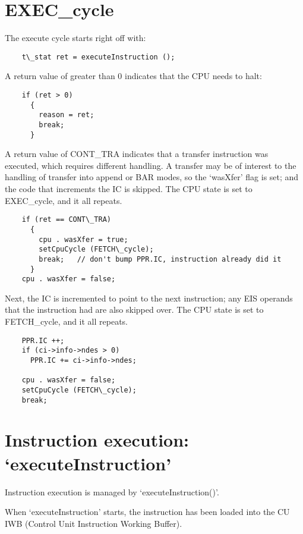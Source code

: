 \documentclass[notitlepage]{report}
\begin{document}
\section{EXEC\_cycle}

The execute cycle starts right off with:

\begin{verbatim}
    t\_stat ret = executeInstruction ();
\end{verbatim}

A return value of greater than 0 indicates that the CPU needs to halt:

\begin{verbatim}
    if (ret > 0)
      {
        reason = ret;
        break;
      }
\end{verbatim}

A return value of CONT\_TRA indicates that a transfer instruction 
was executed, which requires different handling. A transfer 
may be of interest to the handling of
transfer into append or BAR modes, so the `wasXfer' flag is set; and
the code that increments the IC is skipped. The CPU state is set to
EXEC\_cycle, and it all repeats.

\begin{verbatim}
    if (ret == CONT\_TRA)
      {
        cpu . wasXfer = true;
        setCpuCycle (FETCH\_cycle);
        break;   // don't bump PPR.IC, instruction already did it
      }
    cpu . wasXfer = false;
\end{verbatim}


Next, the IC is incremented to point to the next instruction; any
EIS operands that the instruction had are also skipped over.
The CPU state is set to FETCH\_cycle, and it all repeats.

\begin{verbatim}
    PPR.IC ++;
    if (ci->info->ndes > 0)
      PPR.IC += ci->info->ndes;

    cpu . wasXfer = false;
    setCpuCycle (FETCH\_cycle);
    break;
\end{verbatim}


\section{Instruction execution: `executeInstruction'}

Instruction execution is managed by `executeInstruction()'.

When `executeInstruction' starts, the instruction has been loaded
into the CU IWB (Control Unit Instruction Working Buffer).
\end{document}
